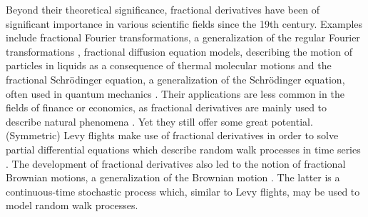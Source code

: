 Beyond their theoretical significance, fractional derivatives have been of significant importance in various scientific fields since the 19th century. Examples include fractional Fourier transformations, a generalization of the regular Fourier transformations \cite{missbauer2012}, fractional diffusion equation models, describing the motion of particles in liquids as a consequence of thermal molecular motions \cite{einstein1905} and the fractional Schrödinger equation, a generalization of the Schrödinger equation, often used in quantum mechanics \cite{laskin2002}. Their applications are less common in the fields of finance or economics, as fractional derivatives are mainly used to describe natural phenomena \cite{boulaaras2023}. Yet they still offer some great potential. (Symmetric) Levy flights make use of fractional derivatives in order to solve partial differential equations which describe random walk processes in time series \cite{scalas2000}. The development of fractional derivatives also led to the notion of fractional Brownian motions, a generalization of the Brownian motion \cite{mandelbrot1968}. The latter is a continuous-time stochastic process which, similar to Levy flights, may be used to model random walk processes.
